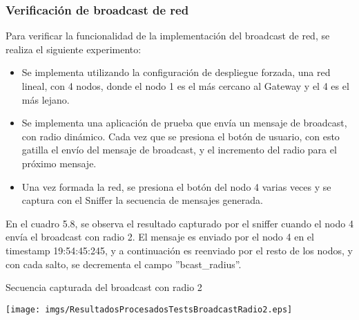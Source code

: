 \subsubsection{Verificación de broadcast de red}
Para verificar la funcionalidad de la implementación del broadcast de red, se realiza el siguiente experimento:

\begin{itemize}
 \item Se implementa utilizando la configuración de despliegue forzada, una red lineal, con 4 nodos, donde el nodo 1 es el más cercano al Gateway y el 4 es el más lejano.

 \item Se implementa una aplicación de prueba que envía un mensaje de broadcast, con radio dinámico. Cada vez que se presiona el botón de usuario, con esto gatilla el envío del mensaje de broadcast, y el incremento del radio para el próximo mensaje.

 \item Una vez formada la red, se presiona el botón del nodo 4 varias veces y se captura con el Sniffer la secuencia de mensajes generada.
\end{itemize}

En el cuadro 5.8, se observa el resultado capturado por el sniffer cuando el nodo 4 envía el broadcast con radio 2. El mensaje es enviado por el nodo 4 en el timestamp 19:54:45:245, y a continuación es reenviado por el resto de los nodos, y con cada salto, se decrementa el campo ''bcast\_radius''.

\begin{center}
\begin{table}[H]
\caption{Secuencia capturada del broadcast con radio 2}
 \texttt{[image: imgs/ResultadosProcesadosTestsBroadcastRadio2.eps]}
\end{table}
\end{center}

